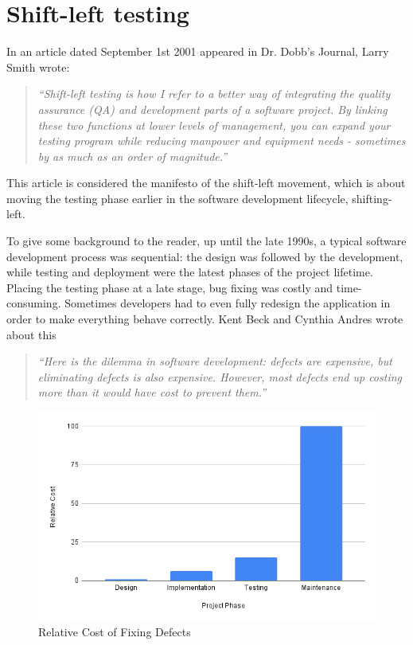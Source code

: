 \chapter{Shift-left testing}\label{chapter:shift-left-testing}
In an article dated September 1st 2001 appeared in Dr. Dobb's Journal, Larry Smith wrote: 
\begin{quote}
\itshape
``Shift-left testing is how I refer to a better way of integrating the quality assurance (QA) and development parts of a software project.  By linking these two functions at lower levels of management, you can expand your testing program while reducing manpower and equipment needs - sometimes by as much as an order of magnitude.'' \cite{10.5555/500399.500404}
\end{quote}
This article is considered the manifesto of the shift-left movement, which is about moving the testing phase earlier in the software development lifecycle, shifting-left.

To give some background to the reader, up until the late 1990s, a typical software development process was sequential: the design was followed by the development, while testing and deployment were the latest phases of the project lifetime. Placing the testing phase at a late stage, bug fixing was costly and time-consuming. Sometimes developers had to even fully redesign the application in order to make everything behave correctly.
Kent Beck and Cynthia Andres wrote about this 
\begin{quote}
\itshape
``Here is the dilemma in software development: defects are expensive, but eliminating defects is also expensive. However, most defects end up costing more than it would have cost to prevent them.'' \cite{beck2004extreme}
\end{quote}

\begin{figure}[ht]
	\centering
	\includegraphics[width=1.0\textwidth]{Immagini/relative_cost_of_fixing_defects.jpg}
	\caption{Relative Cost of Fixing Defects}
	\label{fig:one}
\end{figure}


